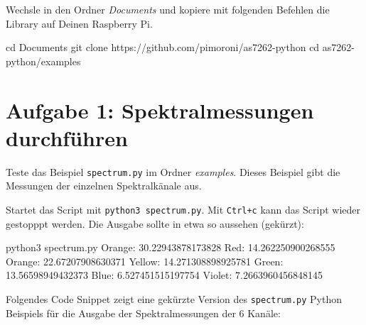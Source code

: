 \documentclass[
  11pt,
  a4paper,
  oneside, openany  ,captions=tableheading
]{scrbook}
\newenvironment{Shaded}{\begin{snugshade}}{\end{snugshade}}
\newcommand{\BuiltInTok}[1]{\textcolor[rgb]{0.00,0.23,0.31}{#1}}
\newcommand{\ExtensionTok}[1]{\textcolor[rgb]{0.00,0.23,0.31}{#1}}
\newcommand{\FunctionTok}[1]{\textcolor[rgb]{0.28,0.35,0.67}{#1}}
\newcommand{\NormalTok}[1]{\textcolor[rgb]{0.00,0.23,0.31}{#1}}
\theoremstyle{remark}
\renewcommand{\markright}[1]{\def\chaptertitle{#1}} %
\begin{document}
Wechsle in den Ordner \emph{Documents} und kopiere mit folgenden
Befehlen die Library auf Deinen Raspberry Pi.

\begin{Shaded}
\begin{Highlighting}[]
\BuiltInTok{cd}\NormalTok{ Documents}
\FunctionTok{git}\NormalTok{ clone https://github.com/pimoroni/as7262{-}python}
\BuiltInTok{cd}\NormalTok{ as7262{-}python/examples}
\end{Highlighting}
\end{Shaded}

\section*{Aufgabe 1: Spektralmessungen
durchführen}\label{aufgabe-1-spektralmessungen-durchfuxfchren}

\markright{Aufgabe 1: Spektralmessungen durchführen}

Teste das Beispiel \texttt{spectrum.py} im Ordner \emph{examples}.
Dieses Beispiel gibt die Messungen der einzelnen Spektralkänale aus.

Startet das Script mit \texttt{python3\ spectrum.py}. Mit
\texttt{Ctrl+c} kann das Script wieder gestopppt werden. Die Ausgabe
sollte in etwa so aussehen (gekürzt):

\begin{Shaded}
\begin{Highlighting}[]
\ExtensionTok{python3}\NormalTok{ spectrum.py}
\ExtensionTok{Orange:}\NormalTok{ 30.22943878173828}
\ExtensionTok{Red:}\NormalTok{    14.262250900268555}
\ExtensionTok{Orange:}\NormalTok{ 22.67207908630371}
\ExtensionTok{Yellow:}\NormalTok{ 14.271308898925781}
\ExtensionTok{Green:}\NormalTok{  13.56598949432373}
\ExtensionTok{Blue:}\NormalTok{   6.527451515197754}
\ExtensionTok{Violet:}\NormalTok{ 7.2663960456848145}
\end{Highlighting}
\end{Shaded}

Folgendes Code Snippet zeigt eine gekürzte Version des
\texttt{spectrum.py} Python Beispiels für die Ausgabe der
Spektralmessungen der 6 Kanäle:
\end{document}
